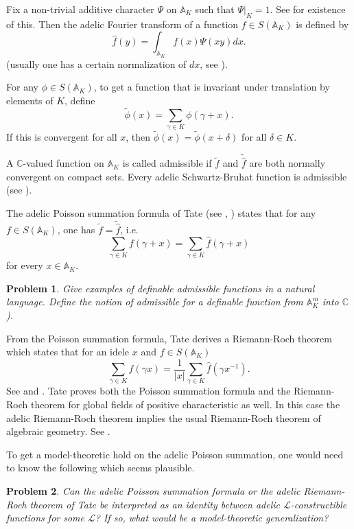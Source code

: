 \documentclass[12pt]{amsart}
\def\A{\mathbb{A}}
\def\C{\mathbb{C}}
\def\cL{\mathcal{L}}
\def\C{\mathbb{C}}
\def\cL{\mathcal{L}}
\numberwithin{equation}{section}
\newtheorem{prob}{Problem}[section]
\begin{document}
Fix a non-trivial additive character $\Psi$ on $\A_K$ such that $\Psi|_{K}=1$. See \cite[Section 7]{ramak} for existence of this. Then the adelic Fourier transform of a function $f\in S(\A_K)$ is defined by 
$$\hat{f}(y)=\int_{\A_K} f(x)\Psi(xy)dx.$$
(usually one has a certain normalization of $dx$, see \cite{ramak}). 

For any $\phi \in S(\A_K)$, to get a function that is invariant under translation by elements of $K$, 
define 
$$\tilde{\phi}(x)=\sum_{\gamma\in K}\phi(\gamma+x).$$ 
If this is convergent for all $x$, then $\tilde{\phi}(x)=\tilde{\phi}(x+\delta)$ for all $\delta \in K$. 

A $\C$-valued function on $\A_K$ is called admissible if $\tilde{f}$ and $\tilde{\hat{f}}$ are both normally convergent on compact sets. Every adelic Schwartz-Bruhat function is admissible (see \cite[Lemma 7-6]{ramak}). 

The adelic Poisson summation formula of 
Tate (see \cite{tate-thesis}, \cite[Theorem 7-7]{ramak}) states that for any $f\in S(\A_K)$, one has $\tilde{f}=\tilde{\hat{f}}$, i.e.
$$\sum_{\gamma \in K} f(\gamma+x)=\sum_{\gamma\in K} \hat{f}(\gamma+x)$$ 
for every $x\in \A_K$. 


\begin{prob} Give examples of definable admissible functions in a natural language. Define the notion of admissible for a definable function from $\A_K^m$ into $\C$).\end{prob}
From the Poisson summation formula, Tate derives a Riemann-Roch theorem which states that for an idele $x$ and $f\in S(\A_K)$
$$\sum_{\gamma \in K} f(\gamma x)=\frac{1}{|x|} \sum_{\gamma \in K} \hat{f}(\gamma x^{-1}).$$
See \cite{tate-thesis} and \cite[Theorem 7-10]{ramak}. Tate proves both the Poisson summation formula and the Riemann-Roch theorem for global fields of positive characteristic as well. In this case the adelic Riemann-Roch theorem  implies the usual Riemann-Roch theorem of algebraic geometry. See \cite[Section 7]{ramak}.

To get a model-theoretic hold on the adelic Poisson summation, one would need to know the following which seems plausible.
\begin{prob}\label{prob-poisson} Can the adelic Poisson summation formula or the adelic Riemann-Roch theorem of Tate be interpreted as an identity between adelic $\cL$-constructible functions for some $\cL$? If so, what would be a model-theoretic generalization?
\end{prob}
\end{document}
